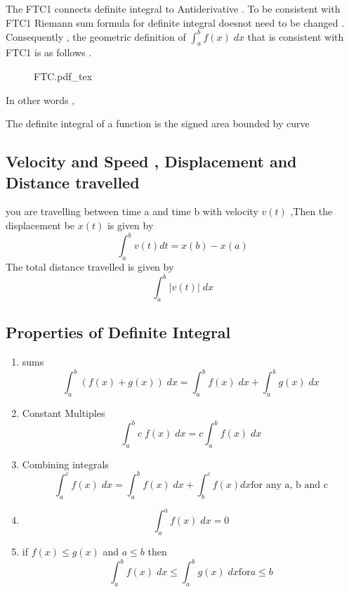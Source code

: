 The FTC1 connects definite integral to Antiderivative . To be consistent with FTC1 
Riemann sum formula for definite integral doesnot need to be changed . 
Consequently , the geometric definition of $\int^{b}_{a} f(x) \; dx$ that is 
consistent with FTC1 is as follows . 

\begin{figure}[H]
	\centering
	\def\svgwidth{\columnwidth}
	{FTC.pdf_tex}
\end{figure}

In other words , 
\begin{definition*}
    The definite integral of a function is the signed area bounded by curve 
\end{definition*}

\subsection{Velocity and Speed , Displacement and Distance travelled}

you are travelling between time a and time b with velocity $v(t)$ ,Then 
the displacement be $x(t)$ is given by 
\[
	\int^{b}_{a} v(t) dt = x(b) -x(a)
\]
The total distance travelled is given by 
\[
	\int^{b}_{a} |{v(t)}| \; dx
\]
\subsection{Properties of Definite Integral}

\begin{enumerate}

     	\item sums
		\begin{equation*}
		    \int^{b}_{a} (f(x)+g(x)) \; dx = \int^{b}_{a} f(x) \; dx + \int^{b}_{a} g(x) \; dx
		\end{equation*}
	\item Constant Multiples
		\begin{equation*}
		    \int^{b}_{a} c \; f(x) \; dx = c \int^{b}_{a} f(x) \; dx
		\end{equation*}
	\item Combining integrals
		\begin{equation*}
		    \int^{c}_{a} f(x)\; dx = \int^{b}_{a} f(x) \; dx + \int^{c}_{b} f(x) dx \text{for any a, b and c}
		\end{equation*}
	\item  
		\begin{equation*}
		    \int^{a}_{a} f(x) \; dx = 0
		\end{equation*}
	

	\item 	if $f(x) \le g(x)$ and $a \le b$ then 
  \[
	\int_{a}^{b} f(x) \; dx \le \int_{a}^{b} g(x) \; dx \text{for} a \le b
  \]
\end{enumerate}

